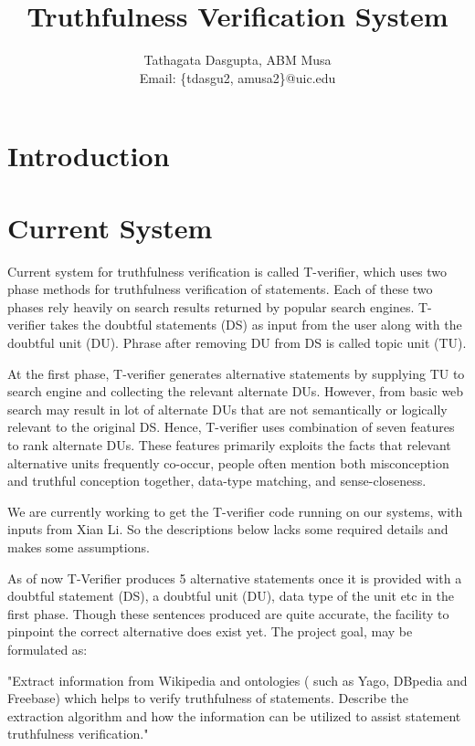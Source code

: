 \documentclass[11pt]{article}
\begin{document}
\title{Truthfulness Verification System}

\author{
Tathagata Dasgupta, ABM Musa\\
Email: \{tdasgu2, amusa2\}@uic.edu
}

\date{}
\maketitle


\section{Introduction}



\section{Current System}
Current system for truthfulness verification is called T-verifier, which uses two phase methods for truthfulness verification of statements. Each of these two phases rely heavily on search results returned by popular search engines. T-verifier takes the doubtful statements (DS) as input from the user along with the doubtful unit (DU). Phrase after removing DU from DS is called topic unit (TU).

At the first phase, T-verifier generates alternative statements by supplying TU to search engine and collecting the relevant alternate DUs. However, from basic web search may result in lot of alternate DUs that are not semantically or logically relevant to the original DS. Hence, T-verifier uses combination of seven features to rank alternate DUs. These features primarily exploits the facts that relevant alternative units frequently co-occur, people often mention both misconception and truthful conception together, data-type matching, and sense-closeness. 


We are currently working to get the T-verifier code running on our
systems, with inputs from Xian Li. So the descriptions below lacks some required
details and makes some assumptions.


As of now T-Verifier produces 5 alternative statements once it is provided with a
doubtful statement (DS), a doubtful unit (DU), data type of the unit etc in the
first phase. Though these sentences produced are quite accurate, the facility to
pinpoint the correct alternative does exist yet. The project goal, may be formulated as:

"Extract information from Wikipedia and ontologies ( such as Yago, DBpedia and
Freebase) which helps to verify truthfulness of statements. Describe the
extraction algorithm and how the information can be utilized to assist statement
truthfulness verification."
\end{document}
